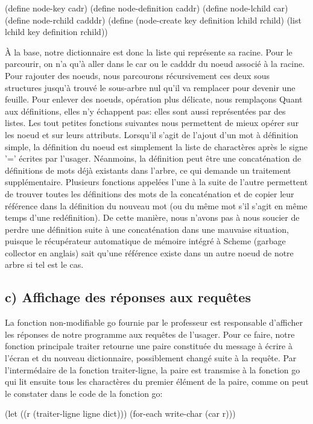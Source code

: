 \documentclass[french]{article}
\begin{document}
			(define node-key cadr)
			(define node-definition caddr)
			(define node-lchild car)
			(define node-rchild cadddr)
			(define (node-create key definition lchild rchild) (list lchild key definition rchild))
			
			À la base, notre dictionnaire est donc la liste qui représente sa racine. Pour le parcourir, on n'a qu'à aller dans le car ou le cadddr du noeud
		associé à la racine. Pour rajouter des noeuds, nous parcourons récursivement ces deux sous structures jusqu'à trouvé le sous-arbre nul qu'il va
		remplacer pour devenir une feuille. Pour enlever des noeuds, opération plus délicate, nous remplaçons
			Quant aux définitions, elles n'y échappent pas: elles sont aussi représentées par des listes. Les tout petites fonctions suivantes nous permettent de mieux opérer sur les noeud et sur leurs attributs. Lorsqu'il s'agit de l'ajout d'un mot à définition
		simple, la définition du noeud est simplement la liste de charactères après le signe '=' écrites par l'usager. Néanmoins, la définition peut
		être une concaténation de définitions de mots déjà existants dans l'arbre, ce qui demande un traitement supplémentaire. Plusieurs fonctions 
		appelées l'une à la suite de l'autre permettent de trouver toutes les définitions des mots de la concaténation et de copier leur référence
		dans la définition du nouveau mot (ou du même mot s'il s'agit en même temps d'une redéfinition). De cette manière, nous n'avons pas à nous soucier
		de perdre une définition suite à une concaténation dans une mauvaise situation, puisque le récupérateur automatique de mémoire intégré à Scheme
		(garbage collector en anglais) sait qu'une référence existe dans un autre noeud de notre arbre si tel est le cas.
		
		\subsection{c) Affichage des réponses aux requêtes}
			La fonction non-modifiable go fournie par le professeur est responsable d'afficher les réponses de notre programme aux requêtes de l'usager. Pour ce faire, notre fonction principale traiter retourne une paire constituée du message à écrire à l'écran et du nouveau dictionnaire, possiblement changé suite à la requête. Par l'intermédaire de la fonction traiter-ligne, la paire est transmise à la fonction go qui lit ensuite tous les charactères du premier élément de la paire, comme on peut le constater dans le code de la fonction go:
			
			(let ((r (traiter-ligne ligne dict)))
            (for-each write-char (car r)))
			
\end{document}
